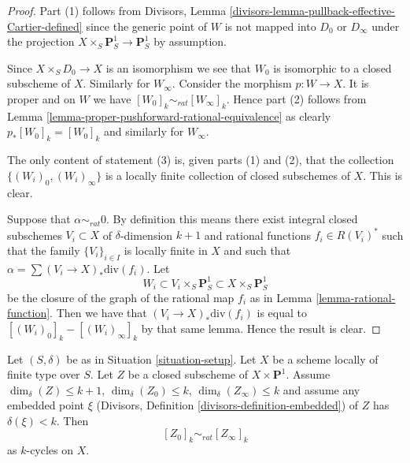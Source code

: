 \begin{proof}
Part (1) follows from
Divisors, Lemma \ref{divisors-lemma-pullback-effective-Cartier-defined}
since the generic point
of $W$ is not mapped into $D_0$ or $D_\infty$ under the projection
$X \times_S \mathbf{P}^1_S \to \mathbf{P}^1_S$ by assumption.

\medskip\noindent
Since $X \times_S D_0 \to X$ is an isomorphism we see that $W_0$
is isomorphic to a closed subscheme of $X$. Similarly for $W_\infty$.
Consider the morphism $p : W \to X$. It is proper and on $W$ we have
$[W_0]_k \sim_{rat} [W_\infty]_k$. Hence part (2) follows from
Lemma \ref{lemma-proper-pushforward-rational-equivalence} as clearly
$p_*[W_0]_k = [W_0]_k$ and similarly for $W_\infty$.

\medskip\noindent
The only content of statement (3) is, given parts (1) and (2), that
the collection $\{(W_i)_0, (W_i)_\infty\}$ is a locally finite collection
of closed subschemes of $X$. This is clear.

\medskip\noindent
Suppose that $\alpha \sim_{rat} 0$.
By definition this means there exist integral closed subschemes
$V_i \subset X$ of $\delta$-dimension $k + 1$ and rational
functions $f_i \in R(V_i)^*$ such that the family
$\{V_i\}_{i \in I}$ is locally finite in $X$ and such that
$\alpha = \sum (V_i \to X)_*\text{div}(f_i)$.
Let
$$
W_i \subset V_i \times_S \mathbf{P}^1_S \subset X \times_S \mathbf{P}^1_S
$$
be the closure of the graph of the rational map $f_i$ as in
Lemma \ref{lemma-rational-function}.
Then we have that $(V_i \to X)_*\text{div}(f_i)$
is equal to $[(W_i)_0]_k - [(W_i)_\infty]_k$ by that same lemma.
Hence the result is clear.
\end{proof}

\begin{lemma}
\label{lemma-closed-subscheme-cross-p1}
Let $(S, \delta)$ be as in Situation \ref{situation-setup}.
Let $X$ be a scheme locally of finite type over $S$.
Let $Z$ be a closed subscheme of $X \times \mathbf{P}^1$.
Assume $\dim_\delta(Z) \leq k + 1$, $\dim_\delta(Z_0) \leq k$,
$\dim_\delta(Z_\infty) \leq k$ and assume
any embedded point $\xi$
(Divisors, Definition \ref{divisors-definition-embedded})
of $Z$ has $\delta(\xi) < k$. Then
$$
[Z_0]_k \sim_{rat} [Z_\infty]_k
$$
as $k$-cycles on $X$.
\end{lemma}

